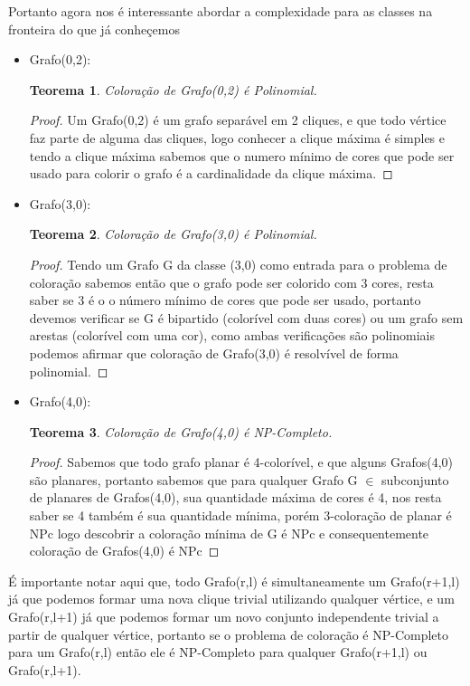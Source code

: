 \documentclass[a4paper,11pt]{article}
\newtheorem{teorema}{Teorema}
\begin{document}
Portanto agora nos é interessante abordar a complexidade para as classes na fronteira do que já conheçemos
\begin{itemize}
  \item Grafo(0,2):
     \begin{teorema}
        Coloração de Grafo(0,2) é Polinomial.
     \end{teorema}
     \begin{proof}
      Um Grafo(0,2) é um grafo separável em 2 cliques, e que todo vértice faz parte de alguma das cliques, logo conhecer a clique máxima é simples e tendo a clique máxima sabemos que o numero mínimo de cores que pode ser usado para colorir o grafo é a cardinalidade da clique máxima.
     \end{proof}
  \item Grafo(3,0):
     \begin{teorema}
        Coloração de Grafo(3,0) é Polinomial.
     \end{teorema}
     \begin{proof}
      Tendo um Grafo G da classe (3,0) como entrada para o problema de coloração sabemos então que o grafo pode ser colorido com 3 cores, resta saber se 3 é o o número mínimo de cores que pode ser usado, portanto devemos verificar se G é bipartido (colorível com duas cores) ou um grafo sem arestas (colorível com uma cor), como ambas verificações são polinomiais podemos afirmar que coloração de Grafo(3,0) é resolvível de forma polinomial.
     \end{proof}
  \item Grafo(4,0):
      \begin{teorema}
        Coloração de Grafo(4,0) é NP-Completo.
      \end{teorema}
      \begin{proof}
        Sabemos que todo grafo planar é 4-colorível, e que alguns Grafos(4,0) são planares, portanto sabemos que para qualquer Grafo G $\in$ subconjunto de planares de Grafos(4,0), sua quantidade máxima de cores é 4, nos resta saber se 4 também é sua quantidade mínima, porém 3-coloração de planar é NPc logo descobrir a coloração mínima de G é NPc e consequentemente coloração de Grafos(4,0) é NPc
      \end{proof}
\end{itemize}

É importante notar aqui que, todo Grafo(r,l) é simultaneamente um Grafo(r+1,l) já que podemos formar uma nova clique trivial utilizando qualquer vértice, e um Grafo(r,l+1) já que podemos formar um novo conjunto independente trivial a partir de qualquer vértice, portanto se o problema de coloração é NP-Completo para um Grafo(r,l) então ele é NP-Completo para qualquer Grafo(r+1,l) ou Grafo(r,l+1).
\end{document}
